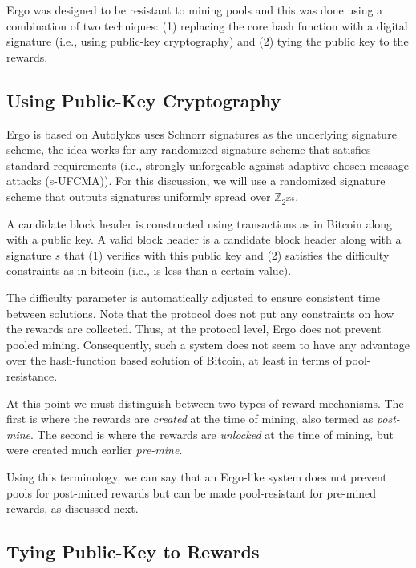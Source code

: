 \documentclass[11pt]{article}
\newcommand{\powname}{Autolykos\xspace}
\begin{document}
Ergo was designed to be resistant to mining pools and this was done using a combination of two techniques: (1) replacing the core hash function with a digital signature (i.e., using public-key cryptography) and (2) tying the public key to the rewards. 

\subsection{Using Public-Key Cryptography}
Ergo is based on \powname uses Schnorr signatures as the underlying signature scheme, the idea works for any randomized signature scheme that satisfies standard requirements (i.e., strongly unforgeable against adaptive chosen message attacks (s-UFCMA)). For this discussion, we will use a randomized signature scheme that outputs signatures uniformly spread over $\mathbb{Z}_{2^{256}}$. 

A candidate block header is constructed using transactions as in Bitcoin along with a public key. A valid block header is a candidate block header along with a signature $s$ that (1) verifies with this public key and (2) satisfies the difficulty constraints as in bitcoin (i.e., is less than a certain value).

The difficulty parameter is automatically adjusted to ensure consistent time between solutions. Note that the protocol does not put any constraints on how the rewards are collected. Thus, at the protocol level, Ergo does not prevent pooled mining. Consequently, such a system does not seem to have any advantage over the hash-function based solution of Bitcoin, at least in terms of pool-resistance.

At this point we must distinguish between two types of reward mechanisms. The first is where the rewards are {\em created} at the time of mining, also termed as {\em post-mine}. The second is where the rewards are {\em unlocked} at the time of mining, but were created much earlier {\em pre-mine}. 

Using this terminology, we can say that an Ergo-like system does not prevent pools for post-mined rewards but can be made pool-resistant for pre-mined rewards, as discussed next.

\subsection{Tying Public-Key to Rewards}
\end{document}
